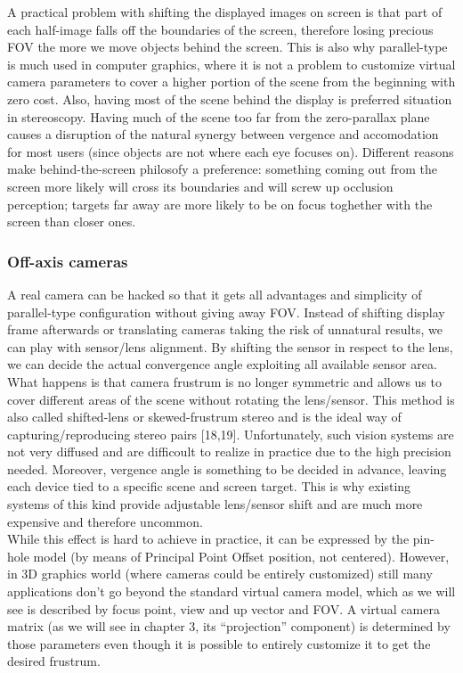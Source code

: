 A practical problem with shifting the displayed images on screen is that part of each half-image falls off the boundaries of the screen, therefore losing precious FOV the more we move objects behind the screen. This is also why parallel-type is much used in computer graphics, where it is not a problem to customize virtual camera parameters to cover a higher portion of the scene from the beginning with zero cost. Also, having most of the scene behind the display is preferred situation in stereoscopy. Having much of the scene too far from the zero-parallax plane causes a disruption of the natural synergy between vergence and accomodation for most users (since objects are not where each eye focuses on). Different reasons make behind-the-screen philosofy a preference: something coming out from the screen more likely will cross its boundaries and will screw up occlusion perception; targets far away are more likely to be on focus toghether with the screen than closer ones.

\subsubsection{Off-axis cameras}
A real camera can be hacked so that it gets all advantages and simplicity of parallel-type configuration without giving away FOV. Instead of shifting display frame afterwards or translating cameras taking the risk of unnatural results, we can play with sensor/lens alignment. By shifting the sensor in respect to the lens, we can decide the actual convergence angle exploiting all available sensor area. What happens is that camera frustrum is no longer symmetric and allows us to cover different areas of the scene without rotating the lens/sensor. This method is also called shifted-lens or skewed-frustrum stereo and is the ideal way of capturing/reproducing stereo pairs [18,19]. Unfortunately, such vision systems are not very diffused and are difficoult to realize in practice due to the high precision needed. Moreover, vergence angle is something to be decided in advance, leaving each device tied to a specific scene and screen target. This is why existing systems of this kind provide adjustable lens/sensor shift and are much more expensive and therefore uncommon.\\
While this effect is hard to achieve in practice, it can be expressed by the pin-hole model (by means of Principal Point Offset position, not centered). However, in 3D graphics world (where cameras could be entirely customized) still many applications don’t go beyond the standard virtual camera model, which as we will see is described by focus point, view and up vector and FOV. A virtual camera matrix (as we will see in chapter 3, its “projection” component) is determined by those parameters even though it is possible to entirely customize it to get the desired frustrum.

